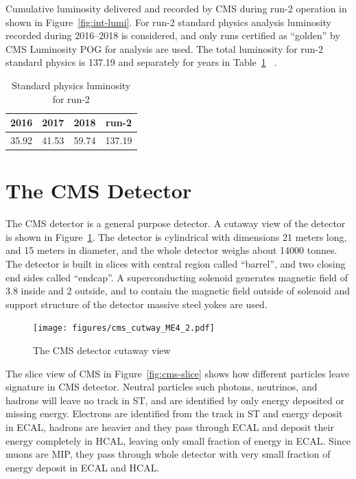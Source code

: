 Cumulative luminosity delivered and recorded by \gls{CMS} during run-2 operation
in shown in Figure~\ref{fig:int-lumi}.
For run-2 standard physics analysis luminosity recorded during
2016--2018 is considered, and only runs certified as ``golden'' by \gls{CMS}
Luminosity \gls{POG} for analysis are used. The total luminosity for run-2
standard physics is 137.19\fbinv{}
and separately for years in Table~\ref{tab:years-lumi}
~\cite{CMS-PAS-LUM-17-001,CMS-PAS-LUM-17-004,CMS-PAS-LUM-18-002}.

\begin{table}[!ht]
  \centering
  \caption[Standard physics luminosity for run-2]%
  {Standard physics luminosity for run-2}
  \begin{tabular}{cccc}
    \toprule
    2016          & 2017          & 2018          & run-2          \\ \midrule
    35.92\fbinv{} & 41.53\fbinv{} & 59.74\fbinv{} & 137.19\fbinv{} \\
    \bottomrule
  \end{tabular}%
  \label{tab:years-lumi}
\end{table}

\section{
  The CMS Detector
 }\label{ch_cms:cms}

The \gls{CMS} detector is a general purpose detector.
A cutaway view of the detector is shown in Figure~\ref{fig:cms-cutaway}.
The detector is cylindrical with dimensions 21 meters long, and 15 meters
in diameter, and the whole detector weighs about 14000 tonnes.
The detector is built in slices with central region called ``barrel'',
and two closing end sides called ``endcap''.
A superconducting solenoid generates magnetic field of 3.8\Tesla{} inside
and 2\Tesla{} outside, and to contain the magnetic field outside of solenoid
and support structure of the detector massive steel yokes are used.

\begin{figure}[!ht]
  \centering
  \texttt{[image: figures/cms\_cutway\_ME4\_2.pdf]}
  \caption[The CMS detector cutaway view]%
  {The CMS detector cutaway view~\cite{image-cms-cutway}}%
  \label{fig:cms-cutaway}
\end{figure}

The slice view of \gls{CMS} in Figure~\ref{fig:cms-slice}
shows how different particles leave signature in \gls{CMS} detector.
Neutral particles such photons, neutrinos, and hadrons will leave no track
in \gls{ST}, and are identified by only energy deposited or missing energy.
Electrons are identified from the track in \gls{ST} and energy deposit
in \gls{ECAL}, hadrons are heavier and they pass through \gls{ECAL}
and deposit their energy completely in \gls{HCAL}, leaving only small fraction
of energy in \gls{ECAL}.
Since muons are \gls{MIP}, they pass through whole detector with very small
fraction of energy deposit in \gls{ECAL} and \gls{HCAL}.

